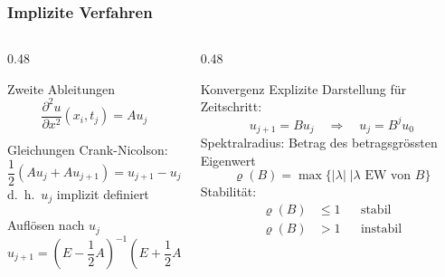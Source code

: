 %
%
%
\begin{frame}
\frametitle{Implizite Verfahren}
\vspace{-15pt}
\begin{columns}[t]
\begin{column}{0.48\hsize}
\begin{block}{Zweite Ableitungen}
\[
\frac{\partial^2 u}{\partial x^2}(x_i,t_j) = Au_j
\]
\end{block}
\begin{block}{Gleichungen}
Crank-Nicolson:
\[
{\textstyle\frac12}(Au_j + Au_{j+1}) = u_{j+1}-u_j
\]
d.~h.~$u_j$ implizit definiert
\end{block}
\begin{block}{Auflösen nach $u_j$}
\vspace{-15pt}
\[
u_{j+1}
=
(E-{\textstyle\frac12}A)^{-1}
(E+{\textstyle\frac12}A)u_j
\]
\end{block}
\end{column}
\begin{column}{0.48\hsize}
\begin{block}{Konvergenz}
Explizite Darstellung für Zeitschritt:
\[
u_{j+1} = Bu_j
\quad\Rightarrow\quad
u_j = B^j u_0
\]
Spektralradius: Betrag des betragsgrössten Eigenwert
\[
\varrho(B) = \max\{ |\lambda|\;| \text{$\lambda$ EW von $B$}\}
\]
Stabilität:
\begin{align*}
\varrho(B) &\le 1 &&\text{stabil}\\
\varrho(B) &> 1 &&\text{instabil}
\end{align*}

\end{block}
\end{column}
\end{columns}

\end{frame}
